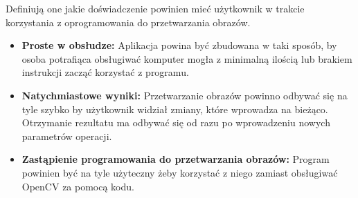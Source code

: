 Definiują one jakie doświadczenie powinien mieć użytkownik w trakcie korzystania z oprogramowania do przetwarzania obrazów.
\begin{itemize}
    \item \textbf{Proste w obsłudze:} Aplikacja powina być zbudowana w taki sposób, by osoba potrafiąca obsługiwać komputer mogła z minimalną ilością lub brakiem instrukcji zacząć korzystać z programu.
    \item \textbf{Natychmiastowe wyniki:} Przetwarzanie obrazów powinno odbywać się na tyle szybko by użytkownik widział zmiany, które wprowadza na bieżąco. Otrzymanie rezultatu ma odbywać się od razu po wprowadzeniu nowych parametrów operacji.
    \item \textbf{Zastąpienie programowania do przetwarzania obrazów:} Program powinien być na tyle użyteczny żeby korzystać z niego zamiast obsługiwać OpenCV za pomocą kodu. 
\end{itemize}